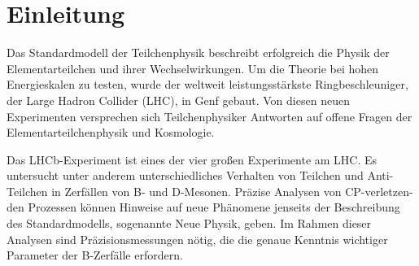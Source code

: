 \documentclass{article}
\begin{document}
\section{Einleitung}
Das Standardmodell der Teilchenphysik beschreibt erfolgreich die Physik der Elementarteilchen und ihrer Wechselwirkungen. Um die Theorie bei hohen Energieskalen zu testen, wurde der weltweit leistungsstärkste Ringbeschleuniger, der Large Hadron Collider (LHC), in Genf gebaut. Von diesen neuen Experimenten versprechen sich Teilchenphysiker Antworten auf offene Fragen der Elementarteilchenphysik und Kosmologie.

Das LHCb-Experiment ist eines der vier großen Experimente am LHC. Es untersucht unter anderem unterschiedliches Verhalten von Teilchen und Anti-Teilchen in Zerfällen von B- und D-Mesonen. Präzise Analysen von CP-verletzen-den Prozessen können Hinweise auf neue Phänomene jenseits der Beschreibung des Standardmodells, sogenannte Neue Physik, geben. %
Im Rahmen dieser Analysen sind Präzisionsmessungen nötig, die die genaue Kenntnis wichtiger Parameter der B-Zerfälle erfordern.



%
%
\end{document}
